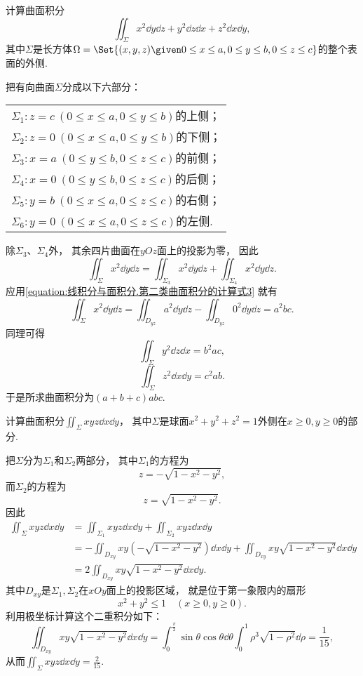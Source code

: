\begin{example}
计算曲面积分\[
	\iint_\Sigma x^2 \dd{y}\dd{z} + y^2 \dd{z}\dd{x} + z^2 \dd{x}\dd{y},
\]
其中\(\Sigma\)是长方体\(\Omega = \Set{
	(x,y,z)
	\given
	0 \leq x \leq a,
	0 \leq y \leq b,
	0 \leq z \leq c
}\)的整个表面的外侧.
\begin{solution}
把有向曲面\(\Sigma\)分成以下六部分：
\begin{center}
	\begin{tabular}{l}
		\(\Sigma_1: z=c\ (0 \leq x \leq a, 0 \leq y \leq b)\)的上侧； \\
		\(\Sigma_2: z=0\ (0 \leq x \leq a, 0 \leq y \leq b)\)的下侧； \\
		\(\Sigma_3: x=a\ (0 \leq y \leq b, 0 \leq z \leq c)\)的前侧； \\
		\(\Sigma_4: x=0\ (0 \leq y \leq b, 0 \leq z \leq c)\)的后侧； \\
		\(\Sigma_5: y=b\ (0 \leq x \leq a, 0 \leq z \leq c)\)的右侧； \\
		\(\Sigma_6: y=0\ (0 \leq x \leq a, 0 \leq z \leq c)\)的左侧. \\
	\end{tabular}
\end{center}
除\(\Sigma_3\)、\(\Sigma_4\)外，
其余四片曲面在\(yOz\)面上的投影为零，
因此\[
	\iint_\Sigma x^2 \dd{y}\dd{z}
	= \iint_{\Sigma_3} x^2 \dd{y}\dd{z}
	+ \iint_{\Sigma_4} x^2 \dd{y}\dd{z}.
\]
应用\cref{equation:线积分与面积分.第二类曲面积分的计算式3} 就有\[
	\iint_\Sigma x^2 \dd{y}\dd{z}
	= \iint_{D_{yz}} a^2 \dd{y}\dd{z}
	- \iint_{D_{yz}} 0^2 \dd{y}\dd{z}
	= a^2 bc.
\]
同理可得\[
	\iint_\Sigma y^2 \dd{z}\dd{x}
	= b^2 ac,
\]\[
	\iint_\Sigma z^2 \dd{x}\dd{y}
	= c^2 ab.
\]
于是所求曲面积分为\((a+b+c) abc\).
\end{solution}
\end{example}

\begin{example}
计算曲面积分\(\iint_\Sigma xyz \dd{x}\dd{y}\)，
其中\(\Sigma\)是球面\(x^2+y^2+z^2=1\)外侧在\(x\geq0,y\geq0\)的部分.
\begin{solution}
把\(\Sigma\)分为\(\Sigma_1\)和\(\Sigma_2\)两部分，
其中\(\Sigma_1\)的方程为\[
	z = -\sqrt{1-x^2-y^2},
\]
而\(\Sigma_2\)的方程为\[
	z = \sqrt{1-x^2-y^2}.
\]
因此\begin{align*}
	\iint_\Sigma xyz \dd{x}\dd{y}
	&= \iint_{\Sigma_1} xyz \dd{x}\dd{y}
	+ \iint_{\Sigma_2} xyz \dd{x}\dd{y} \\
	&= -\iint_{D_{xy}} xy (-\sqrt{1-x^2-y^2}) \dd{x}\dd{y}
	+ \iint_{D_{xy}} xy \sqrt{1-x^2-y^2} \dd{x}\dd{y} \\
	&= 2 \iint_{D_{xy}} xy \sqrt{1-x^2-y^2} \dd{x}\dd{y}.
\end{align*}
其中\(D_{xy}\)是\(\Sigma_1,\Sigma_2\)在\(xOy\)面上的投影区域，
就是位于第一象限内的扇形\[
	x^2+y^2\leq1 \quad(x\geq0,y\geq0).
\]
利用极坐标计算这个二重积分如下：\[
	\iint_{D_{xy}} xy \sqrt{1-x^2-y^2} \dd{x}\dd{y}
	= \int_0^{\frac\pi2} \sin\theta \cos\theta \dd{\theta}
		\int_0^1 \rho^3 \sqrt{1-\rho^2} \dd{\rho}
	= \frac{1}{15},
\]
从而\(\iint_\Sigma xyz \dd{x}\dd{y} = \frac{2}{15}\).
\end{solution}
\end{example}

